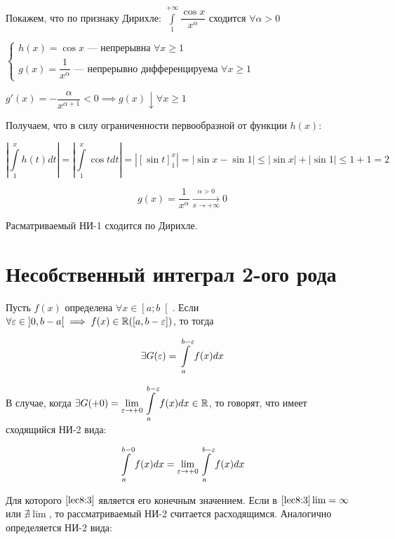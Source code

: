 \documentclass[../../main.tex]{subfiles}
\begin{document}
\begin{exmp}
 Покажем, что по признаку Дирихле: $\displaystyle\int\limits_{1}^{+\infty}\dfrac{\cos{x}}{x^{\alpha}}$ сходится $\forall \alpha > 0$
 
 $\begin{cases}
 h(x) = \cos{x} \text{~--- непрерывна } \forall x \geq 1\\
 g(x) = \dfrac{1}{x^{\alpha}} \text{~--- непрерывно дифференцируема } \forall x \geq 1
 \end{cases}$
 
 $g'(x) = -\dfrac{\alpha}{x^{\alpha + 1}} < 0 \implies g(x) \downarrow \forall x \geq 1$
 
 Получаем, что в силу ограниченности первообразной от функции $h(x)$:
 
 \[\left| \int\limits_{1}^{x}h(t)dt\right| = \left|\int\limits_{1}^{x}\cos{t}dt\right| = \left| \left[ \sin{t}\right]_{1}^{x} \right| = \left| \sin{x} - \sin{1} \right| \leq \left| \sin{x} \right| + \left| \sin{1} \right| \leq 1 + 1 = 2\]
 
 \[g(x) = \dfrac{1}{x^{\alpha}} \xrightarrow[x \to +\infty]{\alpha > 0} 0\]
 
 Расматриваемый НИ-1 сходится по Дирихле.
 \end{exmp}
 
 \section{Несобственный интеграл 2-ого рода}
 
 Пусть $f(x)$ определена $\forall x \in \left[a; b \right[$. Если $\forall \varepsilon \in \left] 0, b - a \right[ \implies f(x) \in \mathbb{R}(\left[a, b - \varepsilon\right])$, то тогда

\begin{equation}\label{lec8:2}
\exists G(\varepsilon) = \displaystyle\int\limits_{a}^{b - \varepsilon}f(x)dx 
\end{equation}

В случае, когда $\exists G(+0) = \underset{\varepsilon \to +0}\lim \displaystyle\int\limits_{a}^{b - \varepsilon}f(x)dx \in \mathbb{R}$, то говорят, что имеет сходящийся НИ-2 вида:

\begin{equation}\label{lec8:3}
\displaystyle\int\limits_{a}^{b - 0}f(x)dx = \underset{\varepsilon \to +0}\lim \displaystyle\int\limits_{a}^{b - \varepsilon}f(x)dx
\end{equation}

Для которого $\eqref{lec8:3}$ является его конечным значением. Если в $\eqref{lec8:3} \lim = \infty$ или $\nexists \lim$, то рассматриваемый НИ-2 считается расходящимся. Аналогично определяется НИ-2 вида:
\end{document}
